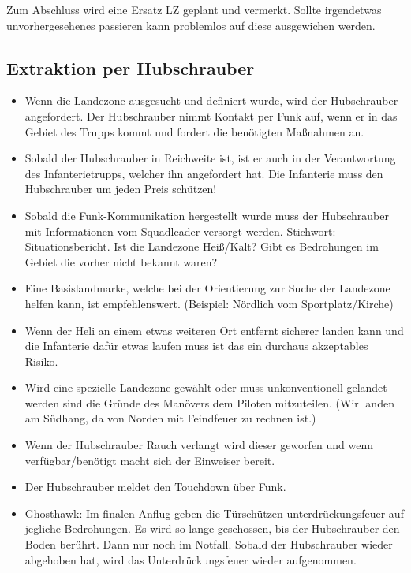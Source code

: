 	Zum Abschluss wird eine Ersatz LZ geplant und vermerkt. Sollte irgendetwas unvorhergesehenes passieren kann problemlos auf diese ausgewichen werden.

\subsection{Extraktion per Hubschrauber}

 	\begin{itemize} 
		\item Wenn die Landezone ausgesucht und definiert wurde, wird der Hubschrauber angefordert. Der Hubschrauber nimmt Kontakt per Funk auf, wenn er in das Gebiet des Trupps kommt und fordert die benötigten Maßnahmen an.

		\item Sobald der Hubschrauber in Reichweite ist, ist er auch in der Verantwortung des Infanterietrupps, welcher ihn angefordert hat. Die Infanterie muss den Hubschrauber um jeden Preis schützen!

		\item Sobald die Funk-Kommunikation hergestellt wurde muss der Hubschrauber mit Informationen vom Squadleader versorgt werden. Stichwort: Situationsbericht. Ist die Landezone Heiß/Kalt? Gibt es Bedrohungen im Gebiet die vorher nicht bekannt waren?

		\item Eine Basislandmarke, welche bei der Orientierung zur Suche der Landezone helfen kann, ist empfehlenswert. (Beispiel: Nördlich vom Sportplatz/Kirche)

		\item Wenn der Heli an einem etwas weiteren Ort entfernt sicherer landen kann und die Infanterie dafür etwas laufen muss ist das ein durchaus akzeptables Risiko.

		\item Wird eine spezielle Landezone gewählt oder muss unkonventionell gelandet werden sind die Gründe des Manövers dem Piloten mitzuteilen. (Wir landen am Südhang, da von Norden mit Feindfeuer zu rechnen ist.)

		\item Wenn der Hubschrauber Rauch verlangt wird dieser geworfen und wenn verfügbar/benötigt macht sich der Einweiser bereit.

		\item Der Hubschrauber meldet den Touchdown über Funk.

		\item Ghosthawk: Im finalen Anflug geben die Türschützen unterdrückungsfeuer auf jegliche Bedrohungen. Es wird so lange geschossen, bis der Hubschrauber den Boden berührt. Dann nur noch im Notfall. Sobald der Hubschrauber wieder abgehoben hat, wird das Unterdrückungsfeuer wieder aufgenommen.


\end{itemize}
